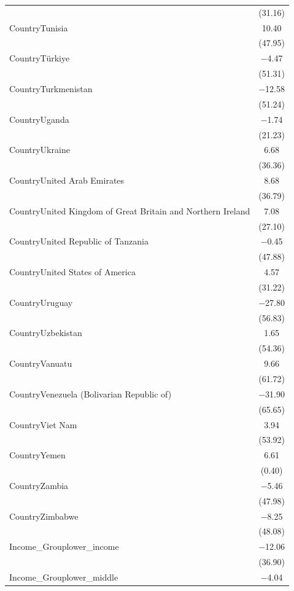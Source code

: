 \documentclass[
  letterpaper,
  DIV=11,
  numbers=noendperiod]{scrartcl}
\begin{document}
\begin{table}
{\begin{tabular}[t]{lc}
 & (\num{31.16})\\
CountryTunisia & \num{10.40}\\
 & (\num{47.95})\\
CountryTürkiye & \num{-4.47}\\
 & (\num{51.31})\\
CountryTurkmenistan & \num{-12.58}\\
 & (\num{51.24})\\
CountryUganda & \num{-1.74}\\
 & (\num{21.23})\\
CountryUkraine & \num{6.68}\\
 & (\num{36.36})\\
CountryUnited Arab Emirates & \num{8.68}\\
 & (\num{36.79})\\
CountryUnited Kingdom of Great Britain and Northern Ireland & \num{7.08}\\
 & (\num{27.10})\\
CountryUnited Republic of Tanzania & \num{-0.45}\\
 & (\num{47.88})\\
CountryUnited States of America & \num{4.57}\\
 & (\num{31.22})\\
CountryUruguay & \num{-27.80}\\
 & (\num{56.83})\\
CountryUzbekistan & \num{1.65}\\
 & (\num{54.36})\\
CountryVanuatu & \num{9.66}\\
 & (\num{61.72})\\
CountryVenezuela (Bolivarian Republic of) & \num{-31.90}\\
 & (\num{65.65})\\
CountryViet Nam & \num{3.94}\\
 & (\num{53.92})\\
CountryYemen & \num{6.61}\\
 & (\num{0.40})\\
CountryZambia & \num{-5.46}\\
 & (\num{47.98})\\
CountryZimbabwe & \num{-8.25}\\
 & (\num{48.08})\\
Income\_Grouplower\_income & \num{-12.06}\\
 & (\num{36.90})\\
Income\_Grouplower\_middle & \num{-4.04}\\

\end{tabular}}
\end{table}
\end{document}
